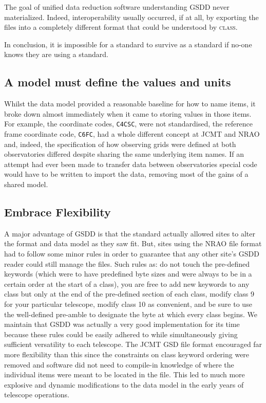 \documentclass[final,authoryear,5p,times,twocolumn]{elsarticle}
\begin{document}
The goal of unified data reduction software understanding GSDD never
materialized. Indeed, interoperability usually occurred, if at all, by exporting
the files into a completely different format that could be understood
by \textsc{class}.

In conclusion, it is impossible for a standard to survive as a standard
if no-one knows they are using a standard.

\subsection{A model must define the values and units}

Whilst the data model provided a reasonable baseline for how to name
items, it broke down almost immediately when it came to storing values
in those items. For example, the coordinate codes, \texttt{C4CSC},
were not standardised, the reference frame coordinate code,
\texttt{C6FC}, had a whole different concept at JCMT and NRAO and,
indeed, the specification of how observing grids were defined at both
observatories differed despite sharing the same underlying item
names. If an attempt had ever been made to transfer data between
observatories special code would have to be written to import the
data, removing most of the gains of a shared model.

\subsection{Embrace Flexibility}

A major advantage of GSDD is that the standard actually allowed sites
to alter the format and data model as they saw fit.  But, sites using
the NRAO file format had to follow some minor rules in order to
guarantee that any other site's GSDD reader could still manage the
files.  Such rules as: do not touch the pre-defined keywords (which
were to have predefined byte sizes and were always to be in a certain
order at the start of a class), you are free to add new keywords to
any class but only at the end of the pre-defined section of each
class, modify class 9 for your particular telescope, modify class 10
as convenient, and be sure to use the well-defined pre-amble to
designate the byte at which every class begins.  We maintain that GSDD
was actually a very good implementation for its time because these
rules could be easily adhered to while simultaneously giving
sufficient versatility to each telescope. The JCMT GSD file format
encouraged far more flexibility than this since the constraints on
class keyword ordering were removed and software did not need to
compile-in knowledge of where the individual items were meant to be
located in the file. This led to much more explosive and
dynamic modifications to the data model in the early years of
telescope operations.
\end{document}
